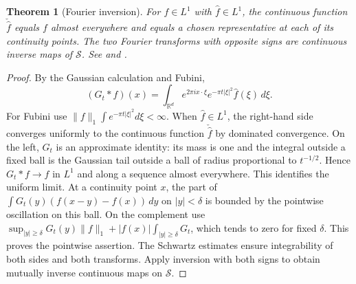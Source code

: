 \documentclass[11pt,oneside,openany]{book}
\newtheorem{theorem}{Theorem}[chapter]
\theoremstyle{definition}
\theoremstyle{remark}
\begin{document}
\begin{theorem}[Fourier inversion]
\label{p102:AN-06-C01-R01}
For \(f\in L^1\) with \(\widehat f\in L^1\), the continuous function \(\check{\widehat f}\) equals \(f\) almost everywhere and equals a chosen representative at each of its continuity points. The two Fourier transforms with opposite signs are continuous inverse maps of \(\mathcal S\). See \cite[\S2.2]{grafakos} and \cite[\S8.3]{folland}.
\end{theorem}
\begin{proof}
By the Gaussian calculation and Fubini,
\[
 (G_t*f)(x)=\int_{\mathbb R^d}e^{2\pi i x\cdot\xi}e^{-\pi t|\xi|^2}\widehat f(\xi)\,d\xi.
\]
For Fubini use \(\|f\|_1\int e^{-\pi t|\xi|^2}d\xi<\infty\). When \(\widehat f\in L^1\), the right-hand side converges uniformly to the continuous function \(\check{\widehat f}\) by dominated convergence. On the left, \(G_t\) is an approximate identity: its mass is one and the integral outside a fixed ball is the Gaussian tail outside a ball of radius proportional to \(t^{-1/2}\). Hence \(G_t*f\to f\) in \(L^1\) and along a sequence almost everywhere. This identifies the uniform limit. At a continuity point \(x\), the part of \(\int G_t(y)(f(x-y)-f(x))\,dy\) on \(|y|<\delta\) is bounded by the pointwise oscillation on this ball. On the complement use \(\sup_{|y|\ge\delta}G_t(y)\|f\|_1+|f(x)|\int_{|y|\ge\delta}G_t\), which tends to zero for fixed \(\delta\). This proves the pointwise assertion. The Schwartz estimates ensure integrability of both sides and both transforms. Apply inversion with both signs to obtain mutually inverse continuous maps on \(\mathcal S\).
\end{proof}
\end{document}
